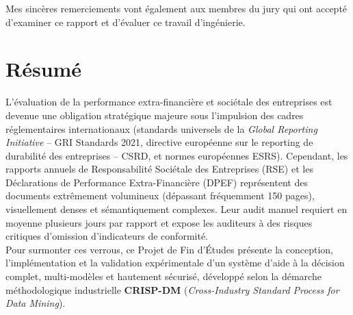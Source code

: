 \documentclass[12pt,a4paper]{report}
\begin{document}
Mes sincères remerciements vont également aux membres du jury qui ont accepté d'examiner ce rapport et d'évaluer ce travail d'ingénierie.

\newpage

\chapter*{Résumé}

L'évaluation de la performance extra-financière et sociétale des entreprises est devenue une obligation stratégique majeure sous l'impulsion des cadres réglementaires internationaux (standards universels de la \textit{Global Reporting Initiative} -- GRI Standards 2021, directive européenne sur le reporting de durabilité des entreprises -- CSRD, et normes européennes ESRS). Cependant, les rapports annuels de Responsabilité Sociétale des Entreprises (RSE) et les Déclarations de Performance Extra-Financière (DPEF) représentent des documents extrêmement volumineux (dépassant fréquemment 150 pages), visuellement denses et sémantiquement complexes. Leur audit manuel requiert en moyenne plusieurs jours par rapport et expose les auditeurs à des risques critiques d'omission d'indicateurs de conformité.\\

Pour surmonter ces verrous, ce Projet de Fin d'Études présente la conception, l'implémentation et la validation expérimentale d'un système d'aide à la décision complet, multi-modèles et hautement sécurisé, développé selon la démarche méthodologique industrielle \textbf{CRISP-DM} (\textit{Cross-Industry Standard Process for Data Mining}).\\
\end{document}
